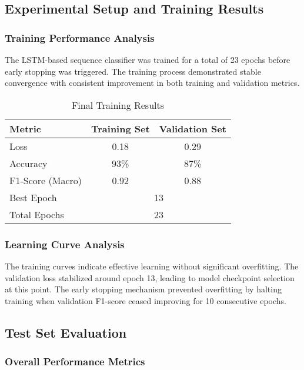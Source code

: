 \documentclass[11pt, a4paper]{article}
\begin{document}
\subsection{Experimental Setup and Training Results}

\subsubsection{Training Performance Analysis}

The LSTM-based sequence classifier was trained for a total of 23 epochs before early stopping was triggered. The training process demonstrated stable convergence with consistent improvement in both training and validation metrics.

\begin{table}[H]
    \centering
    \caption{Final Training Results}
    \label{tab:training_results}
    \begin{tabular}{@{}lcc@{}}
        \toprule
        \textbf{Metric} & \textbf{Training Set} & \textbf{Validation Set} \\ \midrule
        Loss & 0.18 & 0.29 \\
        Accuracy & 93\% & 87\% \\
        F1-Score (Macro) & 0.92 & 0.88 \\
        Best Epoch & \multicolumn{2}{c}{13} \\
        Total Epochs & \multicolumn{2}{c}{23} \\ \bottomrule
    \end{tabular}
\end{table}

\subsubsection{Learning Curve Analysis}

The training curves indicate effective learning without significant overfitting. The validation loss stabilized around epoch 13, leading to model checkpoint selection at this point. The early stopping mechanism prevented overfitting by halting training when validation F1-score ceased improving for 10 consecutive epochs.

\subsection{Test Set Evaluation}

\subsubsection{Overall Performance Metrics}
\end{document}
